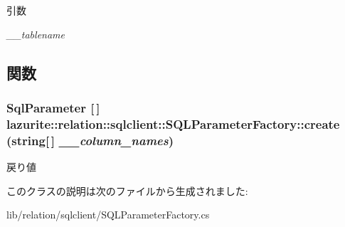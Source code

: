 \begin{DoxyParams}{引数}
\item[{\em \_\-\_\-tablename}]\end{DoxyParams}


\subsection{関数}
\hypertarget{classlazurite_1_1relation_1_1sqlclient_1_1_s_q_l_parameter_factory_ad23e836342c3266b575a3004448ff1fc}{
\subsubsection[{create}]{\setlength{\rightskip}{0pt plus 5cm}SqlParameter \mbox{[}$\,$\mbox{]} lazurite::relation::sqlclient::SQLParameterFactory::create (string\mbox{[}$\,$\mbox{]} {\em \_\-\_\-column\_\-names})}}
\label{classlazurite_1_1relation_1_1sqlclient_1_1_s_q_l_parameter_factory_ad23e836342c3266b575a3004448ff1fc}
\begin{DoxyReturn}{戻り値}

\end{DoxyReturn}


このクラスの説明は次のファイルから生成されました:\begin{DoxyCompactItemize}
\item 
lib/relation/sqlclient/SQLParameterFactory.cs\end{DoxyCompactItemize}
